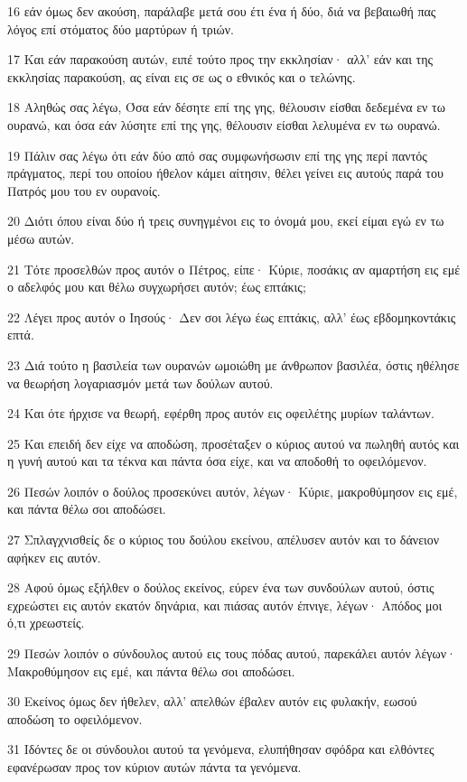 \par 16 εάν όμως δεν ακούση, παράλαβε μετά σου έτι ένα ή δύο, διά να βεβαιωθή πας λόγος επί στόματος δύο μαρτύρων ή τριών.
\par 17 Και εάν παρακούση αυτών, ειπέ τούτο προς την εκκλησίαν· αλλ' εάν και της εκκλησίας παρακούση, ας είναι εις σε ως ο εθνικός και ο τελώνης.
\par 18 Αληθώς σας λέγω, Όσα εάν δέσητε επί της γης, θέλουσιν είσθαι δεδεμένα εν τω ουρανώ, και όσα εάν λύσητε επί της γης, θέλουσιν είσθαι λελυμένα εν τω ουρανώ.
\par 19 Πάλιν σας λέγω ότι εάν δύο από σας συμφωνήσωσιν επί της γης περί παντός πράγματος, περί του οποίου ήθελον κάμει αίτησιν, θέλει γείνει εις αυτούς παρά του Πατρός μου του εν ουρανοίς.
\par 20 Διότι όπου είναι δύο ή τρεις συνηγμένοι εις το όνομά μου, εκεί είμαι εγώ εν τω μέσω αυτών.
\par 21 Τότε προσελθών προς αυτόν ο Πέτρος, είπε· Κύριε, ποσάκις αν αμαρτήση εις εμέ ο αδελφός μου και θέλω συγχωρήσει αυτόν; έως επτάκις;
\par 22 Λέγει προς αυτόν ο Ιησούς· Δεν σοι λέγω έως επτάκις, αλλ' έως εβδομηκοντάκις επτά.
\par 23 Διά τούτο η βασιλεία των ουρανών ωμοιώθη με άνθρωπον βασιλέα, όστις ηθέλησε να θεωρήση λογαριασμόν μετά των δούλων αυτού.
\par 24 Και ότε ήρχισε να θεωρή, εφέρθη προς αυτόν εις οφειλέτης μυρίων ταλάντων.
\par 25 Και επειδή δεν είχε να αποδώση, προσέταξεν ο κύριος αυτού να πωληθή αυτός και η γυνή αυτού και τα τέκνα και πάντα όσα είχε, και να αποδοθή το οφειλόμενον.
\par 26 Πεσών λοιπόν ο δούλος προσεκύνει αυτόν, λέγων· Κύριε, μακροθύμησον εις εμέ, και πάντα θέλω σοι αποδώσει.
\par 27 Σπλαγχνισθείς δε ο κύριος του δούλου εκείνου, απέλυσεν αυτόν και το δάνειον αφήκεν εις αυτόν.
\par 28 Αφού όμως εξήλθεν ο δούλος εκείνος, εύρεν ένα των συνδούλων αυτού, όστις εχρεώστει εις αυτόν εκατόν δηνάρια, και πιάσας αυτόν έπνιγε, λέγων· Απόδος μοι ό,τι χρεωστείς.
\par 29 Πεσών λοιπόν ο σύνδουλος αυτού εις τους πόδας αυτού, παρεκάλει αυτόν λέγων· Μακροθύμησον εις εμέ, και πάντα θέλω σοι αποδώσει.
\par 30 Εκείνος όμως δεν ήθελεν, αλλ' απελθών έβαλεν αυτόν εις φυλακήν, εωσού αποδώση το οφειλόμενον.
\par 31 Ιδόντες δε οι σύνδουλοι αυτού τα γενόμενα, ελυπήθησαν σφόδρα και ελθόντες εφανέρωσαν προς τον κύριον αυτών πάντα τα γενόμενα.
